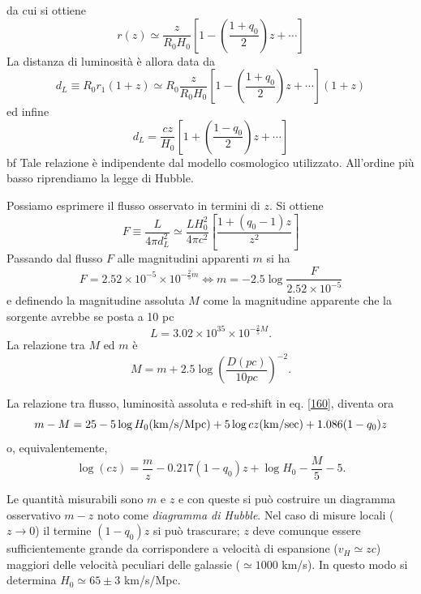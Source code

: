 da cui si ottiene
\begin{equation}
  r(z) \simeq \frac{z}{R_0 H_0} \left[ 1- \left( \frac{1+q_0}{2}\right) z +
    \cdots \right]
\end{equation}
La distanza di luminosità è allora data da
\begin{equation}
  d_L \equiv R_0 r_1 (1+z)
  \simeq R_0 \frac{z}{R_0 H_0} \left[ 1 - \left( \frac{1+q_0}{2} \right) z +
    \cdots \right] (1+z)
\end{equation}
ed infine
\begin{equation}
  d_L = \frac{cz}{H_0} \left[ 1 + \left( \frac{1-q_0}{2} \right) z + \cdots \right]
  \label{1468}
\end{equation}
{bf Tale relazione è indipendente dal modello cosmologico utilizzato}. All'ordine più
basso riprendiamo la legge di Hubble.

Possiamo esprimere il flusso osservato in termini di $z$.  Si ottiene
\begin{equation}
  F \equiv \frac{L}{4 \pi d^2_L} \simeq \frac{L H^2_0}{4 \pi c^2}
  \left[ \frac {1+\left (q_0-1 \right) z}{z^2} \right]
  \label{160}
\end{equation}
Passando dal flusso $F$ alle magnitudini apparenti $m$ si ha
\begin{equation}
  F = 2.52 \times 10^{-5} \times 10^{-\frac{2}{5} m} \iff
  m = -2.5 \log \frac {F}{2.52 \times 10^{-5}}
\end{equation}
e definendo la magnitudine assoluta $M$ come la magnitudine apparente
che la sorgente avrebbe se posta a 10 pc
\begin{equation}
  L = 3.02 \times 10^{35} \times 10^{-\frac{2}{5} M}.
\end{equation}
La relazione tra $M$ ed $m$ è
\begin{equation}
  M = m +2.5 \log \left( \frac{D(pc)}{10 pc}\right)^{-2}.
\end{equation}

La relazione tra flusso, luminosità assoluta e red-shift in eq. \eqref{160},
diventa ora
\begin{equation}
  m-M = 25 - 5 \log H_0 {\rm(km/s/Mpc)}+ 5 \log cz {\rm (km/sec)}+ 1.086 (1-q_0)
  z
\end{equation}
o, equivalentemente,
\begin{equation}
  \log (cz) = \frac{m}{z} - 0.217 (1-q_0)z +\log H_0 - \frac{M}{5} -5.
\end{equation}

Le quantità misurabili sono $m$ e $z$ e con queste si può costruire un diagramma
osservativo $m-z$ noto come \emph{diagramma di Hubble}.  Nel caso di misure
locali ($z \to 0$) il termine $(1-q_0)z$ si può trascurare; $z$ deve comunque
essere sufficientemente grande da corrispondere a velocità di espansione ($v_H
\simeq zc$) maggiori delle velocità peculiari delle galassie ($\simeq 1000$
km/s).  In questo modo si determina $H_0 \simeq 65 \pm 3$ km/s/Mpc.

